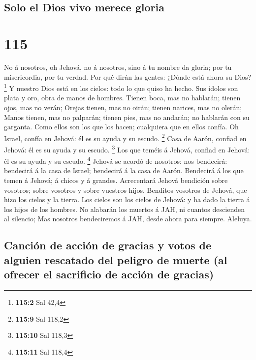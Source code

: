 \hypertarget{solo-el-dios-vivo-merece-gloria}{%
\subsection{Solo el Dios vivo merece
gloria}\label{solo-el-dios-vivo-merece-gloria}}

\hypertarget{section-114}{%
\section{115}\label{section-114}}

 No á nosotros, oh Jehová, no á nosotros, sino á tu nombre
da gloria; por tu misericordia, por tu verdad.  Por qué
dirán las gentes: ¿Dónde está ahora su Dios? \footnote{\textbf{115:2}
  Sal 42,4}  Y nuestro Dios está en los cielos: todo lo que
quiso ha hecho.  Sus ídolos son plata y oro, obra de manos
de hombres.  Tienen boca, mas no hablarán; tienen ojos, mas
no verán;  Orejas tienen, mas no oirán; tienen narices, mas
no olerán;  Manos tienen, mas no palparán; tienen pies, mas
no andarán; no hablarán con su garganta.  Como ellos son los
que los hacen; cualquiera que en ellos confía.  Oh Israel,
confía en Jehová: él es su ayuda y su escudo. \footnote{\textbf{115:9}
  Sal 118,2}  Casa de Aarón, confiad en Jehová: él es su
ayuda y su escudo. \footnote{\textbf{115:10} Sal 118,3} 
Los que teméis á Jehová, confiad en Jehová: él es su ayuda y su escudo.
\footnote{\textbf{115:11} Sal 118,4}  Jehová se acordó de
nosotros: nos bendecirá: bendecirá á la casa de Israel; bendecirá á la
casa de Aarón.  Bendecirá á los que temen á Jehová; á
chicos y á grandes.  Acrecentará Jehová bendición sobre
vosotros; sobre vosotros y sobre vuestros hijos.  Benditos
vosotros de Jehová, que hizo los cielos y la tierra.  Los
cielos son los cielos de Jehová: y ha dado la tierra á los hijos de los
hombres.  No alabarán los muertos á JAH, ni cuantos
descienden al silencio;  Mas nosotros bendeciremos á JAH,
desde ahora para siempre. Aleluya.

\hypertarget{canciuxf3n-de-acciuxf3n-de-gracias-y-votos-de-alguien-rescatado-del-peligro-de-muerte-al-ofrecer-el-sacrificio-de-acciuxf3n-de-gracias}{%
\subsection{Canción de acción de gracias y votos de alguien rescatado
del peligro de muerte (al ofrecer el sacrificio de acción de
gracias)}\label{canciuxf3n-de-acciuxf3n-de-gracias-y-votos-de-alguien-rescatado-del-peligro-de-muerte-al-ofrecer-el-sacrificio-de-acciuxf3n-de-gracias}}

